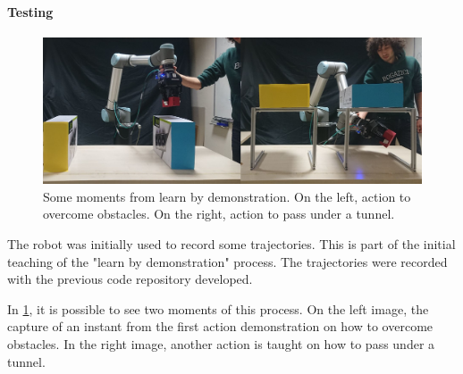 \paragraph{Testing}
\begin{figure}
    \centering
    \includegraphics[width=0.9\linewidth]{Images/6Dteach.jpg}
    \caption{ Some moments from learn by demonstration. On the left, action to overcome obstacles. On the right, action to pass under a tunnel. }
    \label{fig:6Dteach}
\end{figure}

The robot was initially used to record some trajectories. This is part of the initial teaching of the "learn by demonstration" process. The trajectories were recorded with the previous code repository developed. 

In \cref{fig:6Dteach}, it is possible to see two moments of this process. On the left image, the capture of an instant from the first action demonstration on how to overcome obstacles. In the right image, another action is taught on how to pass under a tunnel.

